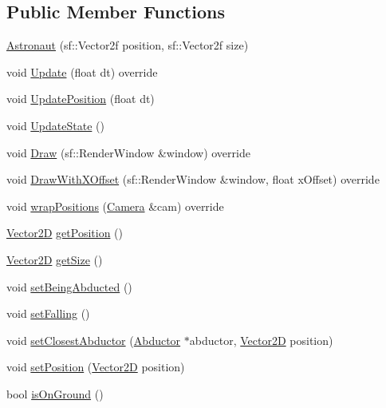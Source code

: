 \subsection*{Public Member Functions}
\begin{DoxyCompactItemize}
\item 
\hyperlink{class_astronaut_a2c973afff53a1eca7b857b6d1dd8ba2f}{Astronaut} (sf\+::\+Vector2f position, sf\+::\+Vector2f size)
\item 
void \hyperlink{class_astronaut_a808e903cd53b5ce1e18c781ec06b1ead}{Update} (float dt) override
\item 
void \hyperlink{class_astronaut_a77c1d345c987d6d046642008a6f44343}{Update\+Position} (float dt)
\item 
void \hyperlink{class_astronaut_a574c4bb77cfb3f416ef1d51e54dca1f0}{Update\+State} ()
\item 
void \hyperlink{class_astronaut_ad87f989c99c64de938c367865cd196c4}{Draw} (sf\+::\+Render\+Window \&window) override
\item 
void \hyperlink{class_astronaut_ab37c4cce5348d86be1ec5ee652f5c917}{Draw\+With\+X\+Offset} (sf\+::\+Render\+Window \&window, float x\+Offset) override
\item 
void \hyperlink{class_astronaut_ab552db56a9d7341b3ce8f8a9b3670004}{wrap\+Positions} (\hyperlink{class_camera}{Camera} \&cam) override
\item 
\hyperlink{class_vector2_d}{Vector2D} \hyperlink{class_astronaut_a1d2ea689431e8aa1d783380b19115f7e}{get\+Position} ()
\item 
\hyperlink{class_vector2_d}{Vector2D} \hyperlink{class_astronaut_a6a526a639f9030f9638c845d90fbf3e4}{get\+Size} ()
\item 
void \hyperlink{class_astronaut_aa5cf10cf36c34114a8ecda156879cf80}{set\+Being\+Abducted} ()
\item 
void \hyperlink{class_astronaut_aca642a5da85bd7546c7750d87ffdad5c}{set\+Falling} ()
\item 
void \hyperlink{class_astronaut_a18df8dbedccb284469ad1f6e85948d3c}{set\+Closest\+Abductor} (\hyperlink{class_abductor}{Abductor} $\ast$abductor, \hyperlink{class_vector2_d}{Vector2D} position)
\item 
void \hyperlink{class_astronaut_afd8ed3067d597c58ab901a6d3cca2b40}{set\+Position} (\hyperlink{class_vector2_d}{Vector2D} position)
\item 
bool \hyperlink{class_astronaut_a1d7672f8b2d02bcb5bd25bd56b92c3b7}{is\+On\+Ground} ()
\end{DoxyCompactItemize}
